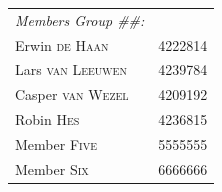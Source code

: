 \documentclass[final]{report}
\begin{document}
\begin{titlingpage}
\begin{tabular}{ll}
\emph{Members Group \#\#:} & \\
Erwin \textsc{de Haan} & 4222814\\
Lars \textsc{van Leeuwen} & 4239784\\
Casper \textsc{van Wezel} & 4209192\\
Robin \textsc{Hes} & 4236815\\
Member \textsc{Five} & 5555555\\
Member \textsc{Six} & 6666666\\
\end{tabular}


{\large \theauthor}\\ [1.0cm]

{\large \thedate}\\ [1.0cm]

\vfill %

\end{titlingpage}
\restoregeometry
\end{document}
